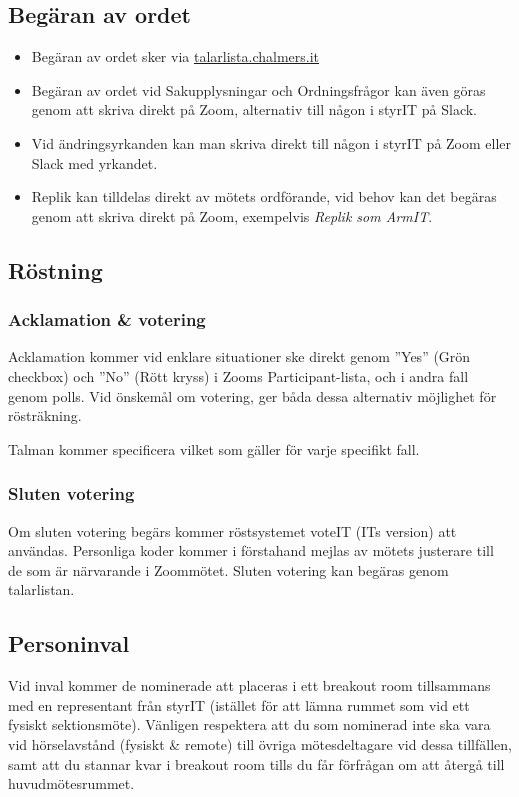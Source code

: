 \documentclass[11pt, noincludeaddress, nopagination]{classes/cthit}
\begin{document}
\subsection*{Begäran av ordet}
\begin{itemize}
    \item Begäran av ordet sker via \href{https://talarlista.chalmers.it/user}{talarlista.chalmers.it}
    \item Begäran av ordet vid Sakupplysningar och Ordningsfrågor kan även göras genom att skriva direkt på Zoom, alternativ till någon i styrIT på Slack.
    \item Vid ändringsyrkanden kan man skriva direkt till någon i styrIT på Zoom eller Slack med yrkandet.
    \item Replik kan tilldelas direkt av mötets ordförande, vid behov kan det begäras genom att skriva direkt på Zoom, exempelvis \textit{Replik som ArmIT}.
\end{itemize}

\subsection*{Röstning}

\begin{adjustwidth}{0.3 cm}{0cm}
\subsubsection*{Acklamation \& votering}
Acklamation kommer vid enklare situationer ske direkt genom ''Yes'' (Grön checkbox) och ''No'' (Rött kryss) i Zooms Participant-lista, och i andra fall genom polls. Vid önskemål om votering, ger båda dessa alternativ möjlighet för rösträkning.

Talman kommer specificera vilket som gäller för varje specifikt fall.

\subsubsection*{Sluten votering}
Om sluten votering begärs kommer röstsystemet voteIT (ITs version) att användas. Personliga koder kommer i förstahand mejlas av mötets justerare till de som är närvarande i Zoommötet. Sluten votering kan begäras genom talarlistan.
\end{adjustwidth}

\subsection*{Personinval}
Vid inval kommer de nominerade att placeras i ett breakout room tillsammans med en representant från styrIT (istället för att lämna rummet som vid ett fysiskt sektionsmöte). Vänligen respektera att du som nominerad inte ska vara vid hörselavstånd (fysiskt & remote) till övriga mötesdeltagare vid dessa tillfällen, samt att du stannar kvar i breakout room tills du får förfrågan om att återgå till huvudmötesrummet.
\end{document}
